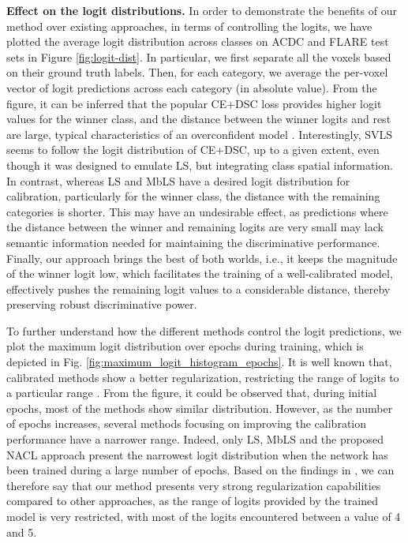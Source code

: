 \documentclass[twocolumn,final,10pt]{elsarticle}
\newcommand{\rev}[1]{{\color{black}#1}}
\begin{document}
\noindent \textbf{\rev{Effect on the logit distributions.}}
\rev{In order to demonstrate the benefits of our method over existing approaches, in terms of controlling the logits, we have plotted the average logit distribution across classes on ACDC and FLARE test sets in Figure \ref{fig:logit-dist}. In particular, we first separate all the voxels based on their ground truth labels. Then, for each category, we average the per-voxel vector of logit predictions across each category (in absolute value). From the figure, it can be inferred that the popular CE+DSC loss provides higher logit values for the winner class, and the distance between the winner logits and rest are large, typical characteristics of an overconfident model \citep{murugesan2022calibrating}. 
Interestingly, SVLS seems to follow the logit distribution of CE+DSC, up to a given extent, even though it was designed to emulate LS, but integrating class spatial information. In contrast, whereas LS and MbLS have a desired logit distribution for calibration, particularly for the winner class, the distance with the remaining categories is shorter. This may have an undesirable effect, as predictions where the distance between the winner and remaining logits are very small may lack semantic information needed for maintaining the discriminative performance. Finally, our approach brings the best of both worlds, i.e., it keeps the magnitude of the winner logit low, which facilitates the training of a well-calibrated model, effectively pushes the remaining logit values to a considerable distance, thereby preserving robust discriminative power. }


\rev{To further understand how the different methods control the logit predictions, we plot the maximum logit distribution over epochs during training, which is depicted in Fig. \ref{fig:maximum_logit_histogram_epochs}. It is well known that, calibrated methods show a better regularization, restricting the range of logits to a particular range \citep{muller2019does}. From the figure, it could be observed that, during initial epochs, most of the methods show similar distribution. However, as the number of epochs increases, several methods focusing on improving the calibration performance have a narrower range. Indeed, only LS, MbLS and the proposed NACL approach present the narrowest logit distribution when the network has been trained during a large number of epochs. Based on the findings in \citep{muller2019does}, we can therefore say that our method presents very strong regularization capabilities compared to other approaches, as the range of logits provided by the trained model is very restricted, with most of the logits encountered between a value of 4 and 5.} 
\end{document}
